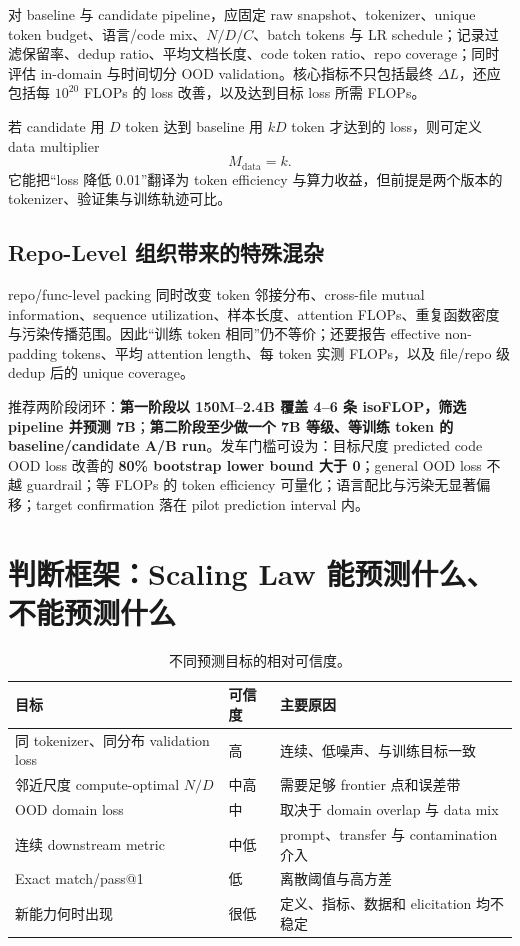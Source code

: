 \documentclass[UTF8,10pt,a4paper,fontset=none]{ctexart}
\begin{document}
对 baseline 与 candidate pipeline，应固定 raw snapshot、tokenizer、unique token budget、语言/code mix、$N/D/C$、batch tokens 与 LR schedule；记录过滤保留率、dedup ratio、平均文档长度、code token ratio、repo coverage；同时评估 in-domain 与时间切分 OOD validation。核心指标不只包括最终 $\Delta L$，还应包括每 $10^{20}$ FLOPs 的 loss 改善，以及达到目标 loss 所需 FLOPs。

若 candidate 用 $D$ token 达到 baseline 用 $kD$ token 才达到的 loss，则可定义 data multiplier
\begin{equation}
  M_{\mathrm{data}}=k.
  \label{zh:eq:data-multiplier}
\end{equation}
它能把“loss 降低 0.01”翻译为 token efficiency 与算力收益，但前提是两个版本的 tokenizer、验证集与训练轨迹可比。

\subsection{Repo-Level 组织带来的特殊混杂}

repo/func-level packing 同时改变 token 邻接分布、cross-file mutual information、sequence utilization、样本长度、attention FLOPs、重复函数密度与污染传播范围。因此“训练 token 相同”仍不等价；还要报告 effective non-padding tokens、平均 attention length、每 token 实测 FLOPs，以及 file/repo 级 dedup 后的 unique coverage。

推荐两阶段闭环：\textbf{第一阶段以 150M--2.4B 覆盖 4--6 条 isoFLOP，筛选 pipeline 并预测 7B}；\textbf{第二阶段至少做一个 7B 等级、等训练 token 的 baseline/candidate A/B run}。发车门槛可设为：目标尺度 predicted code OOD loss 改善的 \textbf{80\% bootstrap lower bound 大于 0}；general OOD loss 不越 guardrail；等 FLOPs 的 token efficiency 可量化；语言配比与污染无显著偏移；target confirmation 落在 pilot prediction interval 内。

\section{判断框架：Scaling Law 能预测什么、不能预测什么}

\begin{table}[htbp]
\centering
\caption{不同预测目标的相对可信度。}
\label{zh:tab:predictability}
\begin{tabularx}{\textwidth}{Y C{2.0cm} Y}
\toprule
目标 & 可信度 & 主要原因 \\
\midrule
同 tokenizer、同分布 validation loss & 高 & 连续、低噪声、与训练目标一致 \\
邻近尺度 compute-optimal $N/D$ & 中高 & 需要足够 frontier 点和误差带 \\
OOD domain loss & 中 & 取决于 domain overlap 与 data mix \\
连续 downstream metric & 中低 & prompt、transfer 与 contamination 介入 \\
Exact match/pass@1 & 低 & 离散阈值与高方差 \\
新能力何时出现 & 很低 & 定义、指标、数据和 elicitation 均不稳定 \\
\bottomrule
\end{tabularx}
\end{table}
\end{document}
